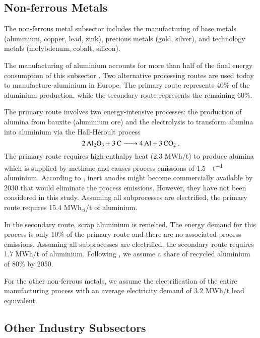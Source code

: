 

\subsection{Non-ferrous Metals}
\label{sec:si:industry:nfm}

The non-ferrous metal subsector includes the manufacturing of base metals
(aluminium, copper, lead, zink), precious metals (gold, silver), and technology
metals (molybdenum, cobalt, silicon).

The manufacturing of aluminium accounts for more than half of the final energy
consumption of this subsector \citeS{}. Two alternative processing routes are
used today to manufacture aluminium in Europe. The primary route represents 40\%
of the aluminium production, while the secondary route represents the remaining
60\%.

The primary route involves two energy-intensive processes: the production of
alumina from bauxite (aluminium ore) and the electrolysis to transform alumina
into aluminium via the  Hall-H\'{e}roult process
\begin{equation}
    \ce{2Al2O3 + 3C -> 4Al + 3\co}.
\end{equation}
The primary route requires high-enthalpy heat (2.3 MWh/t) to produce alumina
which is supplied by methane and causes process emissions of
\SI{1.5}{\tco\per\tonne} aluminium. According to  ,
inert anodes might become commercially available by 2030 that would eliminate
the process emissions. However, they have not been considered in this study.
Assuming all subprocesses are electrified, the primary route requires 15.4
MWh$_{el}$/t of aluminium.

In the secondary route, scrap aluminium is remelted. The energy demand for this
process is only 10\% of the primary route and there are no associated process
emissions. Assuming all subprocesses are electrified, the secondary route
requires 1.7 MWh/t of aluminium. Following , we assume
a share of recycled aluminium of 80\% by 2050.

For the other non-ferrous metals, we assume the electrification of the entire
manufacturing process with an average electricity demand of 3.2 MWh\el/t lead
equivalent.

\subsection{Other Industry Subsectors}
\label{sec:si:industry:other}

